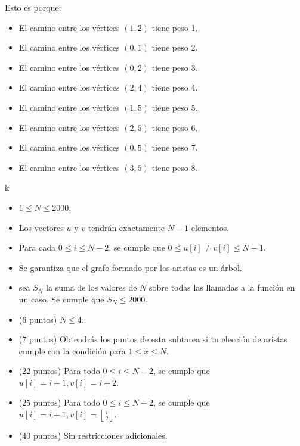 \documentclass[12pt]{scrartcl}
\begin{document}
\begin{itemize}
\begin{center}
            \end{center}
            Esto es porque:
            \begin{itemize}
                \item El camino entre los vértices $(1, 2)$ tiene peso 1.
                \item El camino entre los vértices $(0, 1)$ tiene peso 2.
                \item El camino entre los vértices $(0, 2)$ tiene peso 3.
                \item El camino entre los vértices $(2, 4)$ tiene peso 4.
                \item El camino entre los vértices $(1, 5)$ tiene peso 5.
                \item El camino entre los vértices $(2, 5)$ tiene peso 6.
                \item El camino entre los vértices $(0, 5)$ tiene peso 7.
                \item El camino entre los vértices $(3, 5)$ tiene peso 8.
            \end{itemize}
        \end{itemize}
        k

        \begin{itemize}
            \item $1 \le N \le 2000$.
            \item Los vectores $u$ y $v$ tendrán exactamente $N - 1$ elementos.
            \item Para cada $0 \le i \le N - 2$, se cumple que $0 \le u[i] \neq v[i] \le N - 1$. 
            \item Se garantiza que el grafo formado por las aristas es un árbol.
            \item sea $S_N$ la suma de los valores de $N$ sobre todas las llamadas a la función en un caso. Se cumple que $S_N \le 2000$.
        \end{itemize}
    


    \begin{itemize}
        \item (6 puntos) $N \le 4$.
        \item (7 puntos) Obtendrás los puntos de esta subtarea si tu elección de aristas cumple con la condición para $1 \le x \le N$.
        \item (22 puntos) Para todo $0 \le i \le N - 2$, se cumple que $u[i] = i + 1, v[i] = i + 2$.
        \item (25 puntos) Para todo $0 \le i \le N - 2$, se cumple que $u[i] = i + 1, v[i] = \left\lfloor\frac{i}{2} \right\rfloor$.
        \item (40 puntos) Sin restricciones adicionales.
    \end{itemize}
\end{document}
